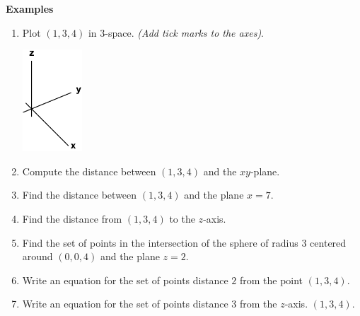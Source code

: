 \documentclass[12pt,letterpaper,noanswers]{exam}
\begin{document}
\textbf{Examples}
\begin{enumerate}
    \item Plot $(1,3,4)$ in $3$-space.  \emph{(Add tick marks to the axes)}.
    
    \includegraphics[height=1.5in]{img/C02axes.png}
    \item Compute the distance between $(1,3,4)$ and the $xy$-plane.
    \vspace{0.3in}
    
        \item  Find the distance between $(1,3,4)$ and the plane $x=7$.
        \vspace{0.7in}
        
        \item  Find the distance from $(1,3,4)$ to the $z$-axis.
        \vspace{0.7in}
        
        \item Find the set of points in the intersection of the sphere of radius $3$ centered around $(0,0,4)$ and the plane $z=2$.
        \vspace{1in}
        
        \item Write an equation for the set of points distance $2$ from the point $(1,3,4)$.
        \vspace{0.7in}
        
        \item Write an equation for the set of points distance $3$ from the $z$-axis.
        $(1,3,4)$.
          \vspace{0.7in}
          
\end{enumerate}
\end{document}
